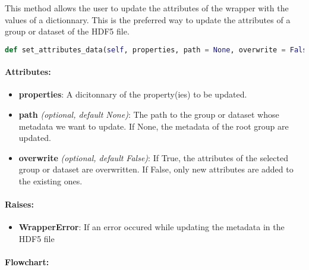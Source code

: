 This method allows the user to update the attributes of the wrapper with the values of a dictionnary. This is the preferred way to update the attributes of a group or dataset of the HDF5 file.

\begin{lstlisting}[language=Python]
def set_attributes_data(self, properties, path = None, overwrite = False):
\end{lstlisting}

\paragraph{Attributes:}

\begin{itemize}
    \item \textbf{properties}: A dicitonnary of the property(ies) to be updated.
    \item \textbf{path} \textit{(optional, default None)}: The path to the group or dataset whose metadata we want to update. If None, the metadata of the root group are updated.
    \item \textbf{overwrite} \textit{(optional, default False)}: If True, the attributes of the selected group or dataset are overwritten. If False, only new attributes are added to the existing ones.
\end{itemize}

\paragraph{Raises:}
\begin{itemize}
    \item \textbf{WrapperError}: If an error occured while updating the metadata in the HDF5 file
\end{itemize}


\paragraph{Flowchart:}

